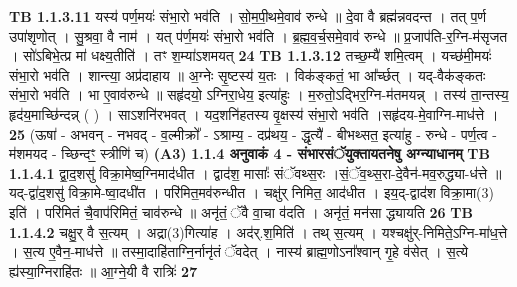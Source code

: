 \documentclass[17pt]{extarticle}
\begin{document}
                  \newline
                                \textbf{ TB 1.1.3.11} \newline
                  यस्य॑ पर्ण॒मयः॑ संभा॒रो भव॑ति । सो॒म॒पी॒थमे॒वाव॑ रुन्धे ॥ दे॒वा वै ब्रह्म॑न्नवदन्त । तत् प॒र्ण उपा॑शृणोत् । सु॒श्रवा॒ वै नाम॑ । यत् प॑र्ण॒मयः॑ संभा॒रो भव॑ति । ब्र॒ह्म॒व॒र्च॒समे॒वाव॑ रुन्धे ॥ प्र॒जाप॑ति-र॒ग्नि-म॑सृजत । सो॑ऽबिभे॒त्प्र मा॑ धक्ष्य॒तीति॑ । तꣳ श॒म्या॑ऽशमयत् \textbf{ 24} \newline
                  \newline
                                \textbf{ TB 1.1.3.12} \newline
                  तच्छ॒म्यै॑ शमि॒त्वम् । यच्छ॑मी॒मयः॑ संभा॒रो भव॑ति । शान्त्या॒ अप्र॑दाहाय ॥ अ॒ग्नेः सृ॒ष्टस्य॑ य॒तः । विक॑ङ्कतं॒ भा आ᳚र्च्छत् । यद्-वैक॑ङ्कतः संभा॒रो भव॑ति । भा ए॒वाव॑रुन्धे ॥ सहृ॑दयो॒ ऽग्निरा॒धेय॒ इत्या॑हुः । म॒रुतो॒ऽद्भिर॒ग्नि-म॑तमयन्न् । तस्य॑ ता॒न्तस्य॒ हृद॑य॒माच्छि॑न्दन्न् ( ) । साऽशनि॑रभवत् । यद॒शनि॑हतस्य वृ॒क्षस्य॑ संभा॒रो भव॑ति ।सहृ॑दय-मे॒वाग्नि-माध॑त्ते । \textbf{ 25} \newline
                  \newline
                                    (ऊषा॑ - अभवन् - नभवद् - व॒ल्मीक्रो᳚ - ऽश्राम्य॒ - दप्र॑थय॒ - द्धृत्यै॑ - बीभथ्सत॒ इत्या॑हु - रुन्धे - पर्ण॒त्व - म॑शमयद - च्छिन्दꣳ॒॒ स्त्रीणि॑ च) \textbf{(A3)} \newline \newline
                \textbf{ 1.1.4     अनुवाकं   4 - संभारसंॅयुक्तायतनेषु अग्न्याधानम्} \newline
                                \textbf{ TB 1.1.4.1} \newline
                  द्वा॒द॒शसु॑ विक्रा॒मेष्व॒ग्निमाद॑धीत । द्वाद॑श॒ मासाः᳚ संॅवथ्स॒रः ।सं॒ॅव॒थ्स॒रा-दे॒वैन॑-मव॒रुद्ध्या-ध॑त्ते ॥ यद्-द्वा॑द॒शसु॑ विक्रा॒मे-ष्वा॒दधी॑त । परि॑मित॒मव॑रुन्धीत । चक्षु॑र् निमित॒ आद॑धीत । इय॒द्-द्वाद॑श विक्रा॒मा(3) इति॑ । परि॑मितं चै॒वाप॑रिमितं॒ चाव॑रुन्धे ॥ अनृ॑तं॒ ॅवै वा॒चा व॑दति । अनृ॑तं॒ मन॑सा द्ध्यायति \textbf{ 26} \newline
                  \newline
                                \textbf{ TB 1.1.4.2} \newline
                  चक्षु॒र् वै स॒त्यम् । अद्रा(3)गित्या॑ह । अद॑र्.श॒मिति॑ । तथ् स॒त्यम् । यश्चक्षु॑र्-निमिते॒ऽग्नि-मा॑ध॒त्ते । स॒त्य ए॒वैन॒-माध॑त्ते ॥ तस्मा॒दाहि॑ताग्नि॒र्नानृ॑तं ॅवदेत् । नास्य॑ ब्राह्म॒णोऽना᳚श्वान् गृ॒हे व॑सेत् । स॒त्ये ह्य॑स्या॒ग्निराहि॑तः ॥ आ॒ग्ने॒यी वै रात्रिः॑ \textbf{ 27} \newline
\end{document}
